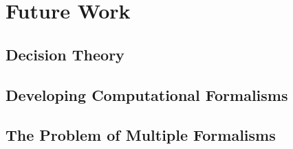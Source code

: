 \section{Future Work}


\subsection{Decision Theory}  %


\subsection{Developing Computational Formalisms}  %


\subsection{The Problem of Multiple Formalisms}  %
